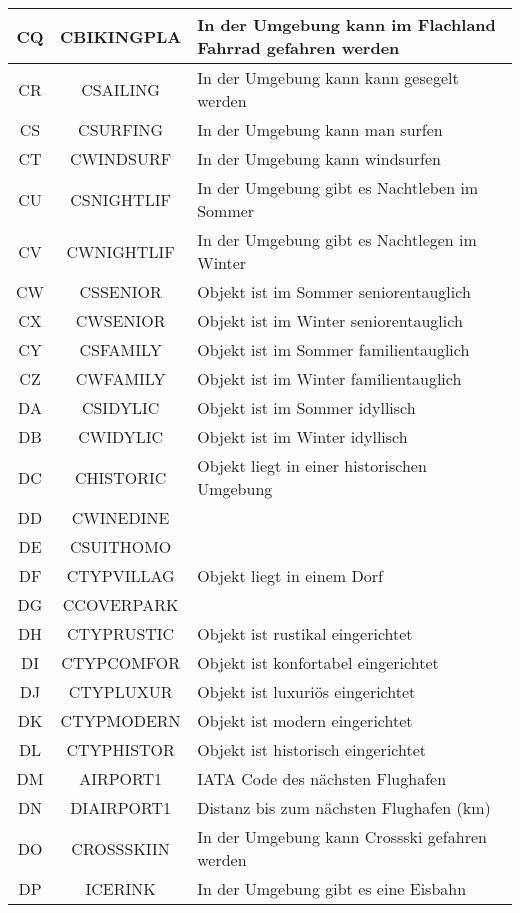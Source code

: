 \begin{longtable}{ | c | c | L{10cm} |}
	CQ & CBIKINGPLA & In der Umgebung kann im Flachland Fahrrad gefahren werden \\ \hline 
	CR & CSAILING & In der Umgebung kann kann gesegelt werden \\ \hline 
	CS & CSURFING & In der Umgebung kann man surfen \\ \hline 
	CT & CWINDSURF & In der Umgebung kann windsurfen \\ \hline 
	CU & CSNIGHTLIF & In der Umgebung gibt es Nachtleben im Sommer \\ \hline 
	CV & CWNIGHTLIF & In der Umgebung gibt es Nachtlegen im Winter \\ \hline 
	CW & CSSENIOR & Objekt ist im Sommer seniorentauglich \\ \hline 
	CX & CWSENIOR & Objekt ist im Winter seniorentauglich \\ \hline 
	CY & CSFAMILY & Objekt ist im Sommer familientauglich \\ \hline 
	CZ & CWFAMILY& Objekt ist im Winter familientauglich \\ \hline 
	DA & CSIDYLIC & Objekt ist im Sommer idyllisch \\ \hline 
	DB & CWIDYLIC& Objekt ist im Winter idyllisch \\ \hline 
	DC & CHISTORIC & Objekt liegt in einer historischen Umgebung \\ \hline 
	DD & CWINEDINE &  \\ \hline 
	DE & CSUITHOMO &  \\ \hline 
	DF & CTYPVILLAG & Objekt liegt in einem Dorf \\ \hline 
	DG & CCOVERPARK &  \\ \hline 
	DH & CTYPRUSTIC & Objekt ist rustikal eingerichtet \\ \hline 
	DI & CTYPCOMFOR & Objekt ist konfortabel eingerichtet \\ \hline 
	DJ & CTYPLUXUR & Objekt ist luxuriös eingerichtet \\ \hline 
	DK & CTYPMODERN & Objekt ist modern eingerichtet \\ \hline 
	DL & CTYPHISTOR & Objekt ist historisch eingerichtet \\ \hline 
	DM & AIRPORT1 & IATA Code des nächsten Flughafen \\ \hline 
	DN & DIAIRPORT1 & Distanz bis zum nächsten Flughafen (km) \\ \hline 
	DO & CROSSSKIIN & In der Umgebung kann Crossski gefahren werden \\ \hline 
	DP & ICERINK & In der Umgebung gibt es eine Eisbahn \\ \hline 

\end{longtable}
